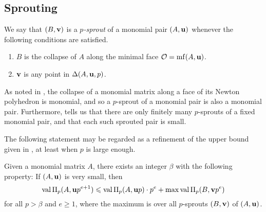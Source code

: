 \documentclass[11pt]{amsart}
\begin{document}


\subsection{Sprouting}

\begin{definition}
\label{p-sprout: D}
We say that $(B, \mathbf{v})$ is a \emph{$p$-sprout} of a monomial pair $(A, \mathbf{u})$ whenever the following conditions are satisfied.
\begin{enumerate}
\item $B$ is the collapse of $A$ along the minimal face $\mathcal{O} = \operatorname{mf}(A, \mathbf{u})$.
\item $\mathbf{v}$ is any point in $\Delta(A, \mathbf{u}, p)$.
\end{enumerate}
\end{definition}

\begin{remark}
\label{p-sprout: R} 
As noted in , the collapse of a monomial matrix along a face of its Newton polyhedron is monomial, and so a $p$-sprout of a monomial pair is also a monomial pair.  Furthermore,    tells us that there are only finitely many $p$-sprouts of a fixed monomial pair, and that each such sprouted pair is small. 
 \end{remark}

The following statement may be regarded as a refinement of the upper bound given in , at least when $p$ is large enough.


\begin{corollary}\label{cor: upper bound for higher mus}
Given a monomial matrix $A$, there exists an integer $\beta$ with the following property\textup:  If $(A, \mathbf{u})$ is very small, then
%
\[ \operatorname{val} \Pi_p(A, \mathbf{u}p^{e+1})  \leqslant  \operatorname{val} \Pi_p(A, \mathbf{u}p) \cdot p^e +  \max \operatorname{val} \Pi_p(B, \mathbf{v}p^e) \] 
%
for all $p > \beta$ and $e \geq 1$, where the maximum is over all $p$-sprouts $(B, \mathbf{v})$ of $(A, \mathbf{u})$.  
\end{corollary}
\end{document}
